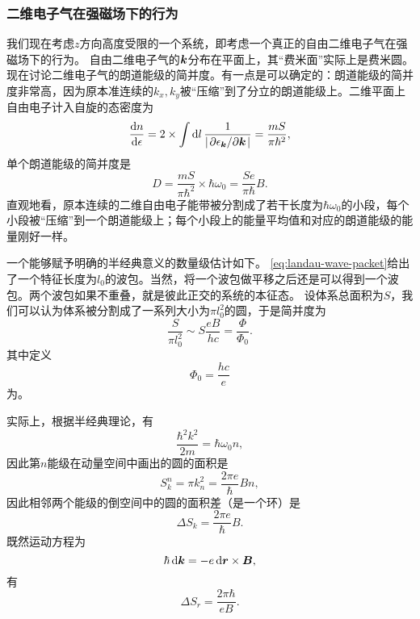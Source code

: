 \subsubsection{二维电子气在强磁场下的行为}\label{sec:2d-electron-magnetic-field}

我们现在考虑$z$方向高度受限的一个系统，即考虑一个真正的自由二维电子气在强磁场下的行为。
自由二维电子气的$\vb*{k}$分布在平面上，其“费米面”实际上是费米圆。
现在讨论二维电子气的朗道能级的简并度。有一点是可以确定的：朗道能级的简并度非常高，因为原本准连续的$k_x, k_y$被“压缩”到了分立的朗道能级上。二维平面上自由电子计入自旋的态密度为
\begin{equation}
    \dv{n}{\epsilon} = 2 \times \int \dd{l} \frac{1}{\abs{\pdv*{\epsilon_{\vb*{k}}}{\vb*{k}}}} = \frac{m S}{\pi \hbar^2},
\end{equation}
单个朗道能级的简并度是
\begin{equation}
    D = \frac{m S}{\pi \hbar^2} \times \hbar \omega_0 = \frac{S e}{\pi \hbar} B.
\end{equation}
直观地看，原本连续的二维自由电子能带被分割成了若干长度为$\hbar \omega_0$的小段，每个小段被“压缩”到一个朗道能级上；每个小段上的能量平均值和对应的朗道能级的能量刚好一样。

一个能够赋予明确的半经典意义的数量级估计如下。
\eqref{eq:landau-wave-packet}给出了一个特征长度为$l_0$的波包。当然，将一个波包做平移之后还是可以得到一个波包。两个波包如果不重叠，就是彼此正交的系统的本征态。
设体系总面积为$S$，我们可以认为体系被分割成了一系列大小为$\pi l_0^2$的圆，于是简并度为
\[
    \frac{S}{\pi l_0^2} \sim S \frac{eB}{h c} = \frac{\Phi}{\Phi_0}.
\]
其中定义
\begin{equation}
    \Phi_0 = \frac{h c}{e}
\end{equation}
为。

实际上，根据半经典理论，有
\[
    \frac{\hbar^2 k^2}{2m} = \hbar \omega_0 n,
\]
因此第$n$能级在动量空间中画出的圆的面积是
\begin{equation}
    S_k^n = \pi k_n^2 = \frac{2 \pi e}{\hbar} B n,
\end{equation}
因此相邻两个能级的倒空间中的圆的面积差（是一个环）是
\begin{equation}
    \Delta S_k = \frac{2 \pi e}{\hbar} B.
\end{equation}
既然运动方程为
\[
    \hbar \dd{\vb*{k}} = - e \dd{\vb*{r}} \times \vb*{B},
\]
有
\begin{equation}
    \Delta S_r = \frac{2\pi \hbar}{eB}.
\end{equation}

